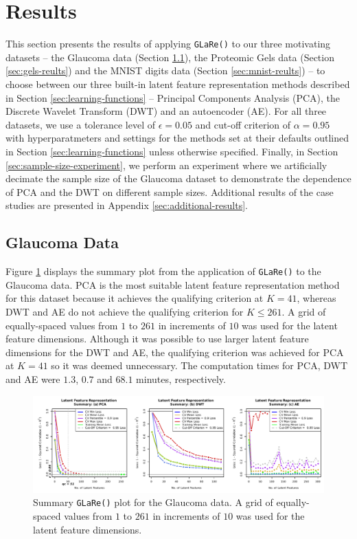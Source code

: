 \section{Results}\label{sec:results}

This section presents the results of applying \texttt{GLaRe()} to our three motivating datasets --  the Glaucoma data (Section \ref{sec:glaucoma-reults}), the Proteomic Gels data (Section \ref{sec:gels-reults}) and the MNIST digits data (Section \ref{sec:mnist-reults}) -- to choose between our three built-in latent feature representation methods described in Section \ref{sec:learning-functions} -- Principal Components Analysis (PCA), the Discrete Wavelet Transform (DWT) and an autoencoder (AE).
For all three datasets, we use a tolerance level of $\epsilon = 0.05$ and cut-off criterion of $\alpha=0.95$ with hyperparatmeters and settings for the methods set at their defaults outlined in Section \ref{sec:learning-functions} unless otherwise specified.
Finally, in Section \ref{sec:sample-size-experiment}, we perform an experiment where we artificially decimate the sample size of the Glaucoma dataset to demonstrate the dependence of PCA and the DWT on different sample sizes.
Additional results of the case studies are presented in Appendix \ref{sec:additional-results}.

\subsection{Glaucoma Data}\label{sec:glaucoma-reults}

Figure \ref{fig:eye-results} displays the summary plot from the application of \texttt{GLaRe()} to the Glaucoma data.
PCA is the most suitable latent feature representation method for this dataset because it achieves the qualifying criterion at $K=41$, whereas DWT and AE do not achieve the qualifying criterion for $K \leq 261$.
A grid of equally-spaced values from $1$ to $261$ in increments of $10$ was used for the latent feature dimensions.
Although it was possible to use larger latent feature dimensions for the DWT and AE, the qualifying criterion was achieved for PCA at $K=41$ so it was deemed unnecessary.
The computation times for PCA, DWT and AE were $1.3$, $0.7$ and $68.1$ minutes, respectively.

\begin{figure}
    \centering
    \includegraphics[width=1\textwidth]{figures/eye-results.pdf}
    \caption{Summary \texttt{GLaRe()} plot for the Glaucoma data. A grid of equally-spaced values from $1$ to $261$ in increments of $10$ was used for the latent feature dimensions.}
    \label{fig:eye-results}
\end{figure}

